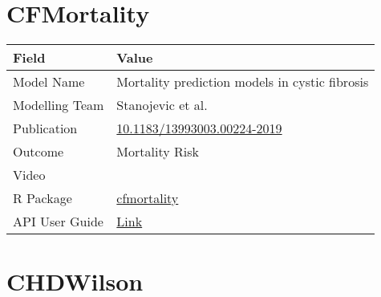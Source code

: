 \documentclass[
]{book}
\begin{document}
\hypertarget{cfmortality}{%
\chapter{CFMortality}\label{cfmortality}}

\begin{longtable}[]{@{}ll@{}}
\toprule
Field & Value\tabularnewline
\midrule
\endhead
Model Name & Mortality prediction models in cystic fibrosis\tabularnewline
Modelling Team & Stanojevic et al.\tabularnewline
Publication & \href{https://doi.org/10.1183/13993003.00224-2019}{10.1183/13993003.00224-2019}\tabularnewline
Outcome & Mortality Risk\tabularnewline
Video & \href{}{}\tabularnewline
R Package & \href{https://cran.r-project.org/package=cfmortality}{cfmortality}\tabularnewline
API User Guide & \href{https://resplab.github.io/prismguide/api-users-guide.html\#cfmortality}{Link}\tabularnewline
\bottomrule
\end{longtable}

\hypertarget{chdwilson}{%
\chapter{CHDWilson}\label{chdwilson}}
\end{document}

